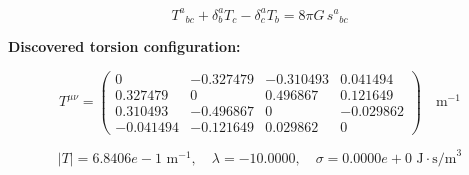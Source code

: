 
\begin{equation}
  T^a{}_{bc} + \delta^a_b T_c - \delta^a_c T_b = 8\pi G \, s^a{}_{bc}
\end{equation}

\textbf{Discovered torsion configuration:}

\begin{equation}
  T^{\mu\nu} = \begin{pmatrix}
    0 & -0.327479 & -0.310493 & 0.041494 \\
    0.327479 & 0 & 0.496867 & 0.121649 \\
    0.310493 & -0.496867 & 0 & -0.029862 \\
    -0.041494 & -0.121649 & 0.029862 & 0
  \end{pmatrix} \quad \text{m}^{-1}
\end{equation}

\begin{equation}
  |T| = 6.8406e-1 \text{ m}^{-1}, \quad
  \lambda = -10.0000, \quad
  \sigma = 0.0000e+0 \text{ J}\cdot\text{s/m}^3
\end{equation}